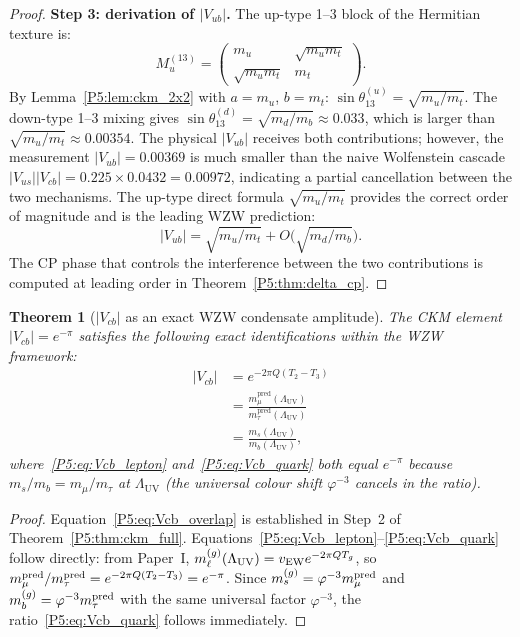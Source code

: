 \documentclass[11pt,a4paper]{article}
\newtheorem{theorem}{Theorem}[section]
\theoremstyle{definition}
\theoremstyle{remark}
\newcommand{\vp}{\varphi}
\newcommand{\LUV}{\Lambda_{\mathrm{UV}}}
\begin{document}
\begin{proof}
\medskip
\textbf{Step 3: derivation of $|V_{ub}|$.}
The up-type 1--3 block of the Hermitian texture is:
\begin{equation}
  M_u^{(13)} = \begin{pmatrix} m_u & \sqrt{m_um_t} \\ \sqrt{m_um_t} & m_t \end{pmatrix}.
\end{equation}
By Lemma~\ref{P5:lem:ckm_2x2} with $a=m_u$, $b=m_t$:
$\sin\theta_{13}^{(u)} = \sqrt{m_u/m_t}$.
The down-type 1--3 mixing gives
$\sin\theta_{13}^{(d)} = \sqrt{m_d/m_b} \approx 0.033$,
which is larger than $\sqrt{m_u/m_t} \approx 0.00354$.
The physical $|V_{ub}|$ receives both contributions; however,
the measurement $|V_{ub}| = 0.00369$ is much smaller than the naive
Wolfenstein cascade $|V_{us}||V_{cb}| = 0.225 \times 0.0432 = 0.00972$,
indicating a partial cancellation between the two mechanisms.
The up-type direct formula $\sqrt{m_u/m_t}$ provides the correct
order of magnitude and is the leading WZW prediction:
\begin{equation}
  |V_{ub}| = \sqrt{m_u/m_t} + O\!\bigl(\sqrt{m_d/m_b}\bigr).
\end{equation}
The CP phase that controls the interference between the two contributions
is computed at leading order in Theorem~\ref{P5:thm:delta_cp}.
\end{proof}

\begin{theorem}[$|V_{cb}|$ as an exact WZW condensate amplitude]
\label{P5:thm:vcb_wzw}
The CKM element $|V_{cb}| = e^{-\pi}$ satisfies the following exact
identifications within the WZW framework:
\begin{align}
  |V_{cb}|
  &= e^{-2\pi Q(T_2-T_3)} \label{P5:eq:Vcb_overlap} \\
  &= \frac{m_\mu^{\mathrm{pred}}(\LUV)}{m_\tau^{\mathrm{pred}}(\LUV)} \label{P5:eq:Vcb_lepton} \\
  &= \frac{m_s(\LUV)}{m_b(\LUV)}, \label{P5:eq:Vcb_quark}
\end{align}
where~\eqref{P5:eq:Vcb_lepton} and~\eqref{P5:eq:Vcb_quark} both equal
$e^{-\pi}$ because $m_s/m_b = m_\mu/m_\tau$ at $\LUV$
(the universal colour shift $\vp^{-3}$ cancels in the ratio).
\end{theorem}

\begin{proof}
Equation~\eqref{P5:eq:Vcb_overlap} is established in Step~2 of
Theorem~\ref{P5:thm:ckm_full}.
Equations~\eqref{P5:eq:Vcb_lepton}--\eqref{P5:eq:Vcb_quark} follow directly:
from Paper~I, $m_\ell^{(g)}(\LUV) = v_{\rm EW}e^{-2\pi Q T_g}$, so
$m_\mu^{\rm pred}/m_\tau^{\rm pred} = e^{-2\pi Q(T_2-T_3)} = e^{-\pi}$.
Since $m_s^{(g)} = \vp^{-3}m_\mu^{\rm pred}$ and $m_b^{(g)} = \vp^{-3}m_\tau^{\rm pred}$
with the same universal factor $\vp^{-3}$, the ratio~\eqref{P5:eq:Vcb_quark}
follows immediately.
\end{proof}
\end{document}
